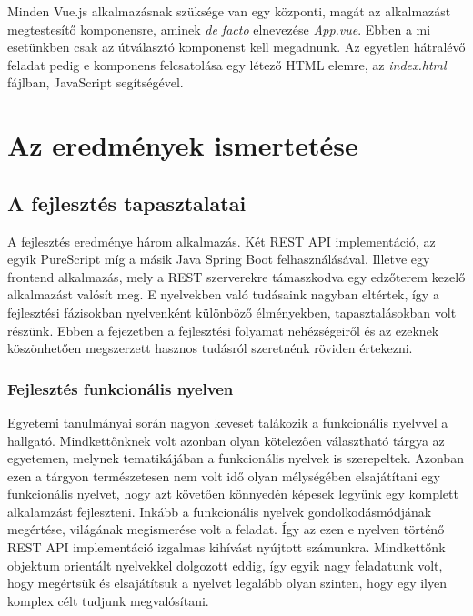 \documentclass[12pt]{article}
\begin{document}
Minden Vue.js alkalmazásnak szüksége van egy központi, magát az alkalmazást megtestesítő komponensre, aminek \textit{de facto} elnevezése \textit{App.vue}. Ebben a mi esetünkben csak az útválasztó komponenst kell megadnunk. Az egyetlen hátralévő feladat pedig e komponens felcsatolása egy létező HTML elemre, az \textit{index.html} fájlban, JavaScript segítségével.

\newpage
\section{Az eredmények ismertetése}
\subsection{A fejlesztés tapasztalatai}

A fejlesztés eredménye három alkalmazás. Két REST API implementáció, az egyik PureScript míg a másik Java Spring Boot felhasználásával. Illetve egy frontend alkalmazás, mely a REST szerverekre támaszkodva egy edzőterem kezelő alkalmazást valósít meg. E nyelvekben való tudásaink nagyban eltértek, így a fejlesztési fázisokban nyelvenként különböző élményekben, tapasztalásokban volt részünk. Ebben a fejezetben a fejlesztési folyamat nehézségeiről és az ezeknek köszönhetően megszerzett hasznos tudásról szeretnénk röviden értekezni.

\subsubsection{Fejlesztés funkcionális nyelven}

Egyetemi tanulmányai során nagyon keveset talákozik a funkcionális nyelvvel a hallgató. Mindkettőnknek volt azonban olyan kötelezően választható tárgya az egyetemen, melynek tematikájában a funkcionális nyelvek is szerepeltek. Azonban ezen a tárgyon természetesen nem volt idő olyan mélységében elsajátítani egy funkcionális nyelvet, hogy azt követően könnyedén képesek legyünk egy komplett alkalamzást fejleszteni. Inkább a funkcionális nyelvek gondolkodásmódjának megértése, világának megismerése volt a feladat. Így az ezen e nyelven történő REST API implementáció izgalmas kihívást nyújtott számunkra. Mindkettőnk objektum orientált nyelvekkel dolgozott eddig, így egyik nagy feladatunk volt, hogy megértsük és elsajátítsuk a nyelvet legalább olyan szinten, hogy egy ilyen komplex célt tudjunk megvalósítani.
\end{document}
